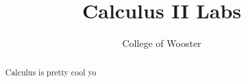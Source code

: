 \documentclass{xourse}
\title{Calculus II Labs}
\author{College of Wooster}
\begin{document}
\maketitle
\begin{abstract}
Calculus is pretty cool yo
\end{abstract}
\end{document}
